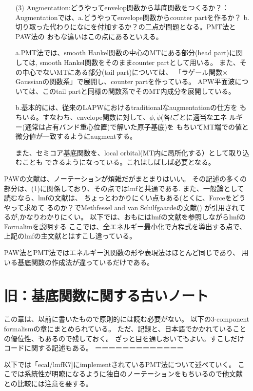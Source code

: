 \documentclass[a4paper,10pt,aip,onecolumn,amsmath,amssymb,floatfix,rmp]{revtex4-1}
\def\phidot{\dot{\phi}}
\begin{document}
\begin{itemize}
\item[(3)]
Augmentation:どうやってenvelop関数から基底関数をつくるか？：\\
Augmentationでは、a.どうやってenvelope関数からcounter partを作るか？
b.切り取った代わりになにを付加するか？の二点が問題となる。PMT法とPAW法の
おもな違いはこの点にあるといえる。

a.PMT法では、smooth Hankel関数の中心のMTにある部分(head part)に関しては,
smooth Hankel関数をそのままcounter partとして用いる。
また、その中心でないMTにある部分(tail part)については、
「ラゲール関数$\times$Gaussianの関数系」で展開し、counter partを作っている。
APW平面波については、このtail partと同様の関数系でそのMT内成分を展開している。

b.基本的には、従来のLAPWにおけるtraditionalなaugmentationの仕方を
もちいる。すなわち、envelope関数に対して、$\phi,\phidot$(各$l$ごとに適当なエネ
ルギー(通常は占有バンド重心位置)で解いた原子基底)を
もちいてMT端での値と微分値が一致するようにaugmentする。


また、セミコア基底関数を、local orbital(MT内に局所化する）として取り込むことも
できるようになっている。これはしばしば必要となる。

\end{itemize}

PAWの文献\cite{kresse99}は、ノーテーションが煩雑だがまとまりはいい。
その記述の多くの部分は、(1)に関係しており、その点ではlmfと共通である.
また、一般論として読むなら、lmfの文献\cite{lmfchap}は、
ちょっとわかりにくい点もある(とくに、Forceをどうやって求めて
るのか？でMethfessel and van Schilfgaardeの文献(\cite{molforce})
が引用されてるが,かなりわかりにくい。
以下では、おもにはlmfの文献を参照しながらlmfのFormalimを説明する
ここでは、全エネルギー最小化で方程式を導出する点で、
上記のlmfの主文献とはすこし違っている。

PAW法とPMT法ではエネルギー汎関数の形や表現法はほとんど同じであり、
用いる基底関数の作成法が違っているだけである。


\section{旧：基底関数に関する古いノート} %
\label{sec:oldbasis}
この章は、以前に書いたもので原則的には読む必要がない。
以下の3-component formalismの章にまとめられている。
ただ、記録と、日本語でかかれていることの優位性、もあるので残しておく。
ざっと目を通しおいてもよい。すこしだけコードに関する記述もある。
ーーーーーーーーーーーーー

以下では「ecal/lmfK7]にimplementされているPMT法について述べていく。
ここでは系統性が明瞭になるように独自のノーテーションをもちいるので他文献
との比較には注意を要する。
\end{document}
